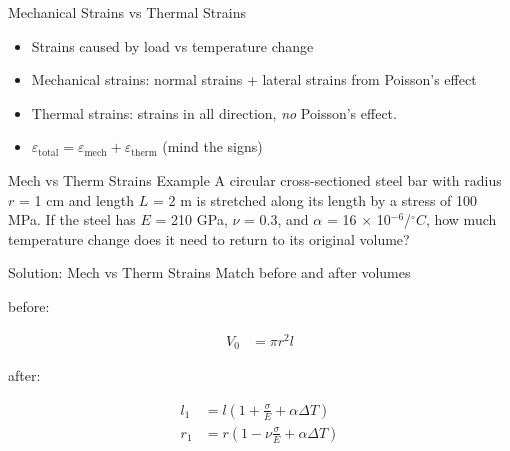 \documentclass[10pt, svgnames]{beamer}
\begin{document}
\begin{frame}[label={sec:orgf31df22}]{Mechanical Strains vs Thermal Strains}
\begin{itemize}
\item Strains caused by load vs temperature change

\item Mechanical strains: normal strains + lateral strains from Poisson's
effect

\item Thermal strains: strains in all direction, \emph{no} Poisson's effect.

\item \(\varepsilon_{\text{total}} = \varepsilon_{\text{mech}} + \varepsilon_{\text{therm}}\)
(mind the signs)
\end{itemize}
\end{frame}

\begin{frame}[label={sec:org889ef94}]{Mech vs Therm Strains Example}
A circular cross-sectioned steel bar with
radius \(r\) = 1 cm and length \(L\) = 2 m is stretched along its length
by a stress of 100 MPa. If the steel has \(E\) = 210 GPa, \(\nu\) = 0.3,
and \(\alpha\) = 16 \(\times\) 10\(^{-6}\)/\(^{\circ}C\), how much
temperature change does it need to return to its original volume?
\end{frame}

\begin{frame}[label={sec:org172daef}]{Solution: Mech vs Therm Strains}
Match before and after volumes

before:

\begin{align*}
    V_{0} &= \pi r^{2} l
\end{align*}

after:

\begin{align*}
    l_{1} &= l \left( 1 + \frac{\sigma}{E} + \alpha \Delta T \right) \\
    r_{1} &= r \left( 1 - \nu \frac{\sigma}{E} + \alpha \Delta T \right) \\
\end{align*}
\end{frame}
\end{document}
